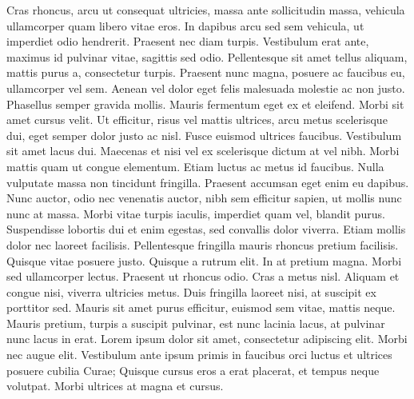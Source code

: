 \documentclass[twoside]{article}
\begin{document}
\autoversenumber Cras rhoncus, arcu ut consequat ultricies, massa ante sollicitudin massa, vehicula ullamcorper quam libero vitae eros.
\autoversenumber In dapibus arcu sed sem vehicula, ut imperdiet odio hendrerit.
\autoversenumber Praesent nec diam turpis.
\autoversenumber Vestibulum erat ante, maximus id pulvinar vitae, sagittis sed odio.
\autoversenumber Pellentesque sit amet tellus aliquam, mattis purus a, consectetur turpis.
\autoversenumber Praesent nunc magna, posuere ac faucibus eu, ullamcorper vel sem.
\autoversenumber Aenean vel dolor eget felis malesuada molestie ac non justo.
\autoversenumber Phasellus semper gravida mollis.
\autoversenumber Mauris fermentum eget ex et eleifend.
\autoversenumber Morbi sit amet cursus velit.
\autoversenumber Ut efficitur, risus vel mattis ultrices, arcu metus scelerisque dui, eget semper dolor justo ac nisl.
\autoversenumber Fusce euismod ultrices faucibus.
\autoversenumber Vestibulum sit amet lacus dui.
\autoversenumber Maecenas et nisi vel ex scelerisque dictum at vel nibh.
\autoversenumber Morbi mattis quam ut congue elementum.
\autoversenumber Etiam luctus ac metus id faucibus.
\autoversenumber Nulla vulputate massa non tincidunt fringilla.
\autoversenumber Praesent accumsan eget enim eu dapibus.
\autoversenumber Nunc auctor, odio nec venenatis auctor, nibh sem efficitur sapien, ut mollis nunc nunc at massa.
\autoversenumber Morbi vitae turpis iaculis, imperdiet quam vel, blandit purus.
\autoversenumber Suspendisse lobortis dui et enim egestas, sed convallis dolor viverra.
\autoversenumber Etiam mollis dolor nec laoreet facilisis.
\autoversenumber Pellentesque fringilla mauris rhoncus pretium facilisis.
\autoversenumber Quisque vitae posuere justo.
\autoversenumber Quisque a rutrum elit.
\autoversenumber In at pretium magna.
\autoversenumber Morbi sed ullamcorper lectus.
\autoversenumber Praesent ut rhoncus odio.
\autoversenumber Cras a metus nisl.
\autoversenumber Aliquam et congue nisi, viverra ultricies metus.
\autoversenumber Duis fringilla laoreet nisi, at suscipit ex porttitor sed.
\autoversenumber Mauris sit amet purus efficitur, euismod sem vitae, mattis neque.
\autoversenumber Mauris pretium, turpis a suscipit pulvinar, est nunc lacinia lacus, at pulvinar nunc lacus in erat.
\autoversenumber Lorem ipsum dolor sit amet, consectetur adipiscing elit.
\autoversenumber Morbi nec augue elit.
\autoversenumber Vestibulum ante ipsum primis in faucibus orci luctus et ultrices posuere cubilia Curae; Quisque cursus eros a erat placerat, et tempus neque volutpat.
\autoversenumber Morbi ultrices at magna et cursus.
\end{document}

